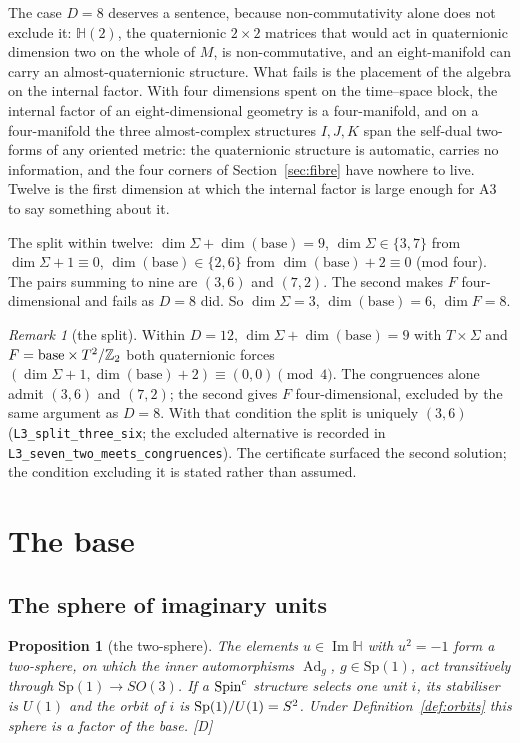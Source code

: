\documentclass[11pt,a4paper]{article}
\theoremstyle{plain}
\newtheorem{proposition}[theorem]{Proposition}
\theoremstyle{definition}
\theoremstyle{remark}
\newtheorem{remark}[theorem]{Remark}
\newcommand{\Hquat}{\mathbb{H}}
\newcommand{\ImH}{\operatorname{Im}\Hquat}
\newcommand{\Ad}{\operatorname{Ad}}
\newcommand{\rigD}{[\textup{D}]}
\begin{document}
The case $D=8$ deserves a sentence, because non-commutativity alone does not exclude it: $\Hquat(2)$, the quaternionic $2\times2$ matrices that would act in quaternionic dimension two on the whole of $M$, is non-commutative, and an eight-manifold can carry an almost-quaternionic structure. What fails is the placement of the algebra on the internal factor. With four dimensions spent on the time--space block, the internal factor of an eight-dimensional geometry is a four-manifold, and on a four-manifold the three almost-complex structures $I,J,K$ span the self-dual two-forms of any oriented metric: the quaternionic structure is automatic, carries no information, and the four corners of Section~\ref{sec:fibre} have nowhere to live. Twelve is the first dimension at which the internal factor is large enough for A3 to say something about it.

The split within twelve: $\dim\Sigma+\dim(\text{base})=9$, $\dim\Sigma\in\{3,7\}$ from $\dim\Sigma+1\equiv0$, $\dim(\text{base})\in\{2,6\}$ from $\dim(\text{base})+2\equiv0$ (mod four). The pairs summing to nine are $(3,6)$ and $(7,2)$. The second makes $F$ four-dimensional and fails as $D=8$ did. So $\dim\Sigma=3$, $\dim(\text{base})=6$, $\dim F=8$.

\begin{remark}[the split]\label{rem:split}
Within $D=12$, $\dim\Sigma+\dim(\text{base})=9$ with $T\times\Sigma$ and $F=\text{base}\times T^2/\mathbb{Z}_2$ both quaternionic forces $(\dim\Sigma+1,\dim(\text{base})+2)\equiv(0,0)\pmod 4$. The congruences alone admit $(3,6)$ and $(7,2)$; the second gives $F$ four-dimensional, excluded by the same argument as $D=8$. With that condition the split is uniquely $(3,6)$ (\texttt{L3\_split\_three\_six}; the excluded alternative is recorded in \texttt{L3\_seven\_two\_meets\_congruences}). The certificate surfaced the second solution; the condition excluding it is stated rather than assumed.
\end{remark}

\section{The base}\label{sec:base}

\subsection{The sphere of imaginary units}

\begin{proposition}[the two-sphere]\label{prop:S2}
The elements $u\in\ImH$ with $u^{2}=-1$ form a two-sphere, on which the inner automorphisms $\Ad_{g}$, $g\in\mathrm{Sp}(1)$, act transitively through $\mathrm{Sp}(1)\to SO(3)$. If a $\text{Spin}^c$ structure selects one unit $i$, its stabiliser is $U(1)$ and the orbit of $i$ is $\mathrm{Sp}(1)/U(1)=S^2$. Under Definition~\ref{def:orbits} this sphere is a factor of the base. \rigD
\end{proposition}
\end{document}
